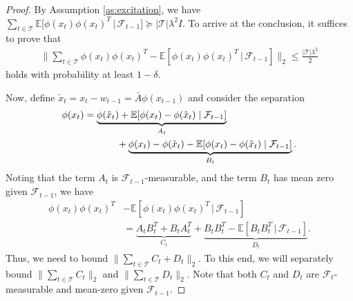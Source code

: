 \documentclass[letterpaper,10pt,conference]{ieeeconf}
\theoremstyle{plain} %
\theoremstyle{plain} %
\theoremstyle{plain} %
\theoremstyle{plain}
\begin{document}
\begin{proof}
By Assumption \ref{as:excitation}, we have $\sum_{t\in\mathcal{T}}\mathbb{E}[\phi(x_t) \phi(x_t)^T\,|\, \mathcal{F}_{t-1}]\succeq |\mathcal{T}|\lambda^2 I$. To arrive at the conclusion, it suffices to prove that 
\begin{align*}
   \biggr\| \sum_{t\in \mathcal{T}} \phi(x_t) \phi(x_t)^T -\mathbb{E}[\phi(x_t) \phi(x_t)^T\,|\, \mathcal{F}_{t-1}] \biggr\|_2 \le \frac{|\mathcal{T}|\lambda^2}{2}
\end{align*}
holds with probability at least $1-\delta$.

Now, define $\tilde x_t = x_t - w_{t-1} = \bar A \phi(x_{t-1})$ and consider the separation
\begin{align*}
   & \phi(x_t) = \underbrace{\phi(\tilde x_t) +\mathbb{E}[\phi(x_t) - \phi(\tilde x_t) \mid\mathcal{F}_{t-1}]}_{A_t} \\&\hspace{20mm}+ \underbrace{\phi(x_t) - \phi(\tilde x_t) -\mathbb{E}[\phi(x_t) - \phi(\tilde x_t) \mid\mathcal{F}_{t-1}] }_{B_t}.
\end{align*}
   Noting that the term $A_t$ is $\mathcal{F}_{t-1}$-measurable, and the term $B_t$ has mean zero given $\mathcal{F}_{t-1}$, we have 
   \begin{align*}
     \phi(x_t) \phi(x_t)^T&-  \mathbb{E}[\phi(x_t)\phi(x_t)^T\,|\,\mathcal{F}_{t-1}]
    \\&=\underbrace{A_t B_t^T + B_tA_t^T}_{C_t} +\underbrace{ B_tB_t^T   -\mathbb{E}[B_t B_t^T\,|\,\mathcal{F}_{t-1}]}_{D_t}.
   \end{align*}
  Thus, we need to bound $\|\sum_{t\in \mathcal{T}} C_t + D_t\|_2$. To this end, we will  separately bound $\|\sum_{t\in \mathcal{T}}C_t\|_2$ and $\|\sum_{t\in \mathcal{T}}D_t\|_2$. Note that both $C_t$ and $D_t$ are $\mathcal{F}_t$-measurable and mean-zero given $\mathcal{F}_{t-1}$.


\end{proof}
\end{document}
